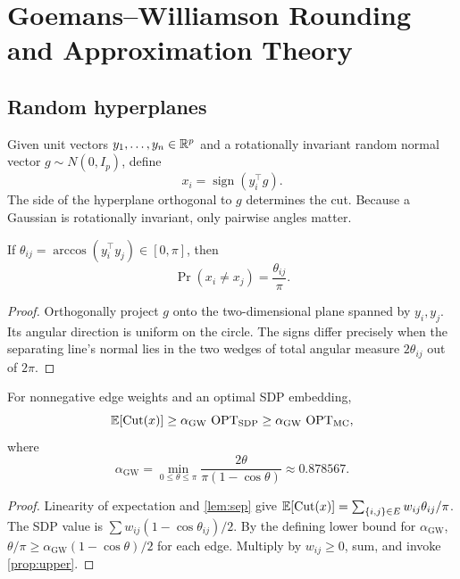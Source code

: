 \chapter{Goemans--Williamson Rounding and Approximation Theory}\label{ch:rounding}
\section{Random hyperplanes}
Given unit vectors $y_1,\ldots,y_n\in\mathbb{R}^p$ and a rotationally invariant random normal vector $g\sim N(0,I_p)$, define
\begin{equation}\label{eq:gw-round}
x_i=\operatorname{sign}(y_i^\top g).
\end{equation}
The side of the hyperplane orthogonal to $g$ determines the cut. Because a Gaussian is rotationally invariant, only pairwise angles matter.

\begin{lemma}\label{lem:sep}
If $\theta_{ij}=\arccos(y_i^\top y_j)\in[0,\pi]$, then
\[
\Pr(x_i\ne x_j)=\frac{\theta_{ij}}{\pi}.
\]
\end{lemma}
\begin{proof}
Orthogonally project $g$ onto the two-dimensional plane spanned by $y_i,y_j$. Its angular direction is uniform on the circle. The signs differ precisely when the separating line's normal lies in the two wedges of total angular measure $2\theta_{ij}$ out of $2\pi$.
\end{proof}

\begin{theorem}\label{thm:gw}
For nonnegative edge weights and an optimal SDP embedding,
\[
\mathbb{E}[\operatorname{Cut}(x)]\ge \alpha_{\mathrm{GW}}\,\operatorname{OPT}_{\mathrm{SDP}}\ge\alpha_{\mathrm{GW}}\,\operatorname{OPT}_{\mathrm{MC}},
\]
where
\begin{equation}\label{eq:alpha}
\alpha_{\mathrm{GW}}=\min_{0\le\theta\le\pi}
\frac{2\theta}{\pi(1-\cos\theta)}\approx0.878567.
\end{equation}
\end{theorem}
\begin{proof}
Linearity of expectation and \cref{lem:sep} give
$\mathbb{E}[\operatorname{Cut}(x)]=\sum_{\{i,j\}\in E}w_{ij}\theta_{ij}/\pi$. The SDP value is $\sum w_{ij}(1-\cos\theta_{ij})/2$. By the defining lower bound for $\alpha_{\mathrm{GW}}$, $\theta/\pi\ge\alpha_{\mathrm{GW}}(1-\cos\theta)/2$ for each edge. Multiply by $w_{ij}\ge0$, sum, and invoke \cref{prop:upper}.
\end{proof}

